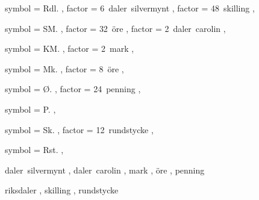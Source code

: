

 {
	symbol = { Rdl. } ,
	factor = { 6~daler~silvermynt } ,
	factor = { 48~skilling } ,
}

 {
	symbol = { SM. } ,
	factor = { 32~öre } ,
	factor = { 2~daler~carolin } ,
}


 {
	symbol = { KM. } ,
	factor = { 2~mark } ,
}

 {
	symbol = { Mk. } ,
	factor = { 8~öre } ,
}

 {
	symbol = { Ø. } ,
	factor = { 24~penning } ,
}

 {
	symbol = { P. } ,
}

 {
	symbol = { Sk. } ,
	factor = { 12~rundstycke } ,
}

 {
	symbol = { Rst. } ,
}

 {
	daler~silvermynt ,
	daler~carolin ,
	mark ,
	öre ,
	penning
}

 {
	riksdaler ,
	skilling ,
	rundstycke
}